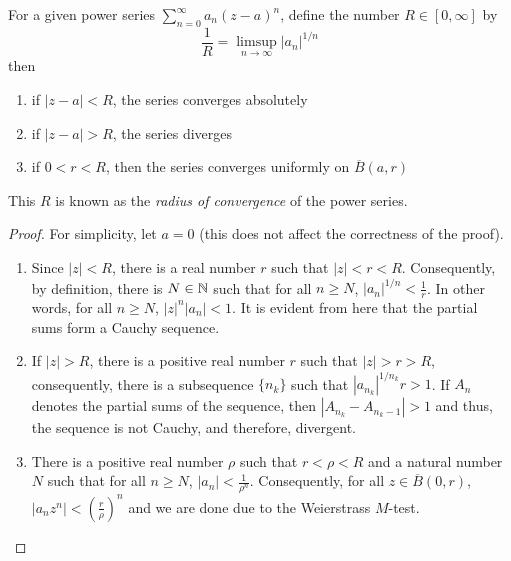 \begin{theorem}
    For a given power series $\sum\limits_{n = 0}^\infty a_n(z - a)^n$, define the number $R\in [0,\infty]$ by 
    \begin{equation*}
        \frac{1}{R} = \limsup_{n\to\infty}|a_n|^{1/n}
    \end{equation*}
    then 
    \begin{enumerate}[label=(\alph*)]
        \item if $|z - a| < R$, the series converges absolutely 
        \item if $|z - a| > R$, the series diverges 
        \item if $0 < r < R$, then the series converges uniformly on $\overline B(a, r)$
    \end{enumerate}
    This $R$ is known as the \textit{radius of convergence} of the power series.
\end{theorem}
\begin{proof}
For simplicity, let $a = 0$ (this does not affect the correctness of the proof). 
\begin{enumerate}[label=(\alph*)]
    \item Since $|z| < R$, there is a real number $r$ such that $|z| < r < R$. Consequently, by definition, there is $N\in\mathbb{N}$ such that for all $n\ge N$, $|a_n|^{1/n} < \frac{1}{r}$. In other words, for all $n\ge N$, $|z|^n|a_n| < 1$. It is evident from here that the partial sums form a Cauchy sequence.

    \item If $|z| > R$, there is a positive real number $r$ such that $|z| > r > R$, consequently, there is a subsequence $\{n_k\}$ such that $|a_{n_k}|^{1/n_k}r > 1$. If $A_n$ denotes the partial sums of the sequence, then $|A_{n_k} - A_{n_k - 1}| > 1$ and thus, the sequence is not Cauchy, and therefore, divergent.

    \item There is a positive real number $\rho$ such that $r < \rho < R$ and a natural number $N$ such that for all $n\ge N$, $|a_n| < \frac{1}{\rho^n}$. Consequently, for all $z\in\overline B(0,r)$, $|a_nz^n| < \left(\frac{r}{\rho}\right)^n$ and we are done due to the Weierstrass $M$-test.
\end{enumerate}
\end{proof}

